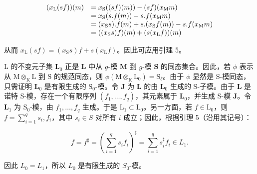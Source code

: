 \[
\begin{array}{r l} (x _ {\mathrm{L}} (s f)) (m) & = x _ {\mathrm{S}} ((s f) (m)) - (s f) (x _ {\mathrm{M}} m) \\ & = x _ {\mathrm{S}} (s. f (m)) - s. f (x _ {\mathrm{M}} m) \\ & = (x _ {\mathrm{S}} s). f (m) + s. (x _ {\mathrm{S}} f (m)) - s. f (x _ {\mathrm{M}} m) \\ & = ((x _ {\mathrm{S}} s) f) (m) + (s (x _ {\mathrm{L}} f)) (m) \end{array}
\]

从而 \(x_{\mathrm{L}}(sf) = (x_{\mathrm{S}}s)f + s(x_{\mathrm{L}}f)\)。因此可应用引理 5。

L 的不变元子集 \(\mathbf{L}_0\) 正是 \(\mathbf{L}\) 中从 \(g\)-模 \(\mathbf{M}\) 到 \(g\)-模 \(\mathbf{S}\) 的同态集合。因此，若 \(\phi\) 表示从 \(\mathrm{M} \otimes_{\mathrm{K}} \mathrm{L}\) 到 \(\mathrm{S}\) 的规范同态，则 \(\phi(\mathrm{M} \otimes_{\mathrm{K}} \mathrm{L}_0) = \mathrm{S}_{\delta}\)。由于 \(\phi\) 显然是 S-模同态，只需证明 \(\mathbf{L}_0\) 是有限生成的 \(\mathrm{S}_0\)-模。令 \(\mathbf{J}\) 为 \(\mathbf{L}\) 的由 \(\mathbf{L}_0\) 生成的 S-子模。由于 \(\mathbf{L}\) 是诺特 S-模，存在一个有限序列 \((f_1, \ldots, f_q)\)，其元素属于 \(\mathbf{L}_0\)，并生成 S-模 \(\mathbf{J}\)。令 \(\mathbf{L}_1\) 为 \(\mathrm{S}_0\)-模，由 \(f_{1},\ldots ,f_{q}\) 生成。于是 \(\mathrm{L}_1\subset \mathrm{L}_0\)。另一方面，若 \(f\in \mathrm{L}_0\)，则 \(f = \sum_{i = 1}^{q}s_{i},f_{i}\)，其中 \(s_i\in S\) 对所有 \(i\) 成立；因此，根据引理 5（沿用其记号）：

\[
f = f ^ {\sharp} = \left(\sum_ {i = 1} ^ {q} s _ {i} f _ {i}\right) ^ {\sharp} = \sum_ {i = 1} ^ {q} s _ {i} ^ {\sharp} f _ {i} \in L _ {1}.
\]

因此 \(L_{0} = L_{1}\)，所以 \(L_{0}\) 是有限生成的 \(S_{0}\)-模。

